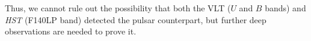\documentclass[pdftex,twocolumn]{aastex62}
\newcommand{\va}[1]{{\color[rgb]{1.0,0.0,0.0}VA: #1}}
\newcommand{\gp}[1]{{\color{blue} #1}}
\begin{document}

Thus, we cannot rule out the possibility that both the VLT ($U$ and $B$ bands) and {\sl HST} (F140LP band) detected the pulsar counterpart, but further deep observations are needed to prove it.









\end{document}
